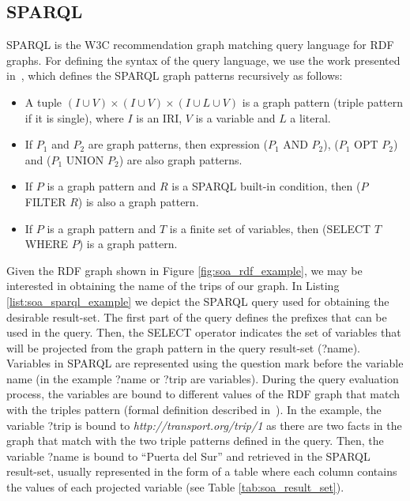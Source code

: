 \subsection{SPARQL}
SPARQL is the W3C recommendation graph matching query language for RDF graphs. For defining the syntax of the query language, we use the work presented in~\citep{perez2009semantics}, which defines the SPARQL graph patterns recursively as follows:
\begin{itemize}
    \item A tuple $(I \cup V) \times (I \cup V) \times (I \cup L \cup V)$ is a graph pattern (triple pattern if it is single), where $I$ is an IRI, $V$ is a variable and $L$ a literal.
    \item If $P_1$ and $P_2$ are graph patterns, then expression ($P_1$ AND $P_2$), ($P_1$ OPT $P_2$) and ($P_1$ UNION $P_2$) are also graph patterns.
    \item If $P$ is a graph pattern and $R$ is a SPARQL built-in condition, then ($P$ FILTER $R$) is also a graph pattern.
    \item If $P$ is a graph pattern and $T$ is a finite set of variables, then (SELECT $T$ WHERE $P$) is a graph pattern.
\end{itemize}

Given the RDF graph shown in Figure \ref{fig:soa_rdf_example}, we may be interested in obtaining the name of the trips of our graph. In Listing \ref{list:soa_sparql_example} we depict the SPARQL query used for obtaining the desirable result-set. The first part of the query defines the prefixes that can be used in the query. Then, the SELECT operator indicates the set of variables that will be projected from the graph pattern in the query result-set (?name). Variables in SPARQL are represented using the question mark before the variable name (in the example ?name or ?trip are variables). During the query evaluation process, the variables are bound to different values of the RDF graph that match with the triples pattern (formal definition described in~\citep{perez2009semantics}). In the example, the variable ?trip is bound to \textit{http://transport.org/trip/1 } as there are two facts in the graph that match with the two triple patterns defined in the query. Then, the variable ?name is bound to ``Puerta del Sur'' and retrieved in the SPARQL result-set, usually represented in the form of a table where each column contains the values of each projected variable (see Table \ref{tab:soa_result_set}).




